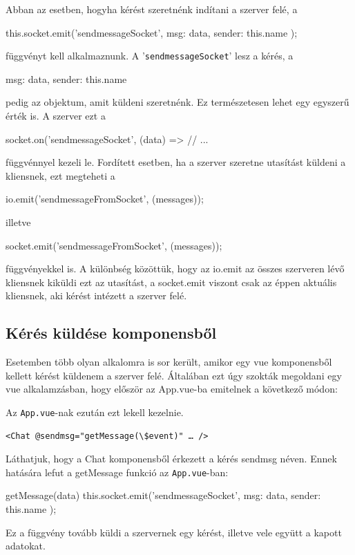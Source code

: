 
Abban az esetben, hogyha kérést szeretnénk indítani a szerver felé, a
\begin{javascript}
this.socket.emit('sendmessageSocket', {
	msg: data, sender: this.name
});
\end{javascript}
függvényt kell alkalmaznunk. A '\texttt{sendmessageSocket}' lesz a kérés, a 
\begin{javascript}
{msg: data, sender: this.name}
\end{javascript}
pedig az objektum, amit küldeni szeretnénk. Ez természetesen lehet egy egyszerű érték is. A szerver ezt a
\begin{javascript}
socket.on('sendmessageSocket', (data) => {
  // ...
}
\end{javascript}

függvénnyel kezeli le. Fordített esetben, ha a szerver szeretne utasítást küldeni a kliensnek, ezt megteheti a
\begin{javascript}
io.emit('sendmessageFromSocket', (messages));
\end{javascript}
illetve
\begin{javascript}
socket.emit('sendmessageFromSocket', (messages));
\end{javascript}
függvényekkel is. A különbség közöttük, hogy az io.emit az összes szerveren lévő kliensnek kiküldi ezt az utasítást, a socket.emit viszont csak az éppen aktuális kliensnek, aki kérést intézett a szerver felé.

\subsection{Kérés küldése komponensből}

Esetemben több olyan alkalomra is sor került, amikor egy vue komponensből kellett kérést küldenem a szerver felé. Általában ezt úgy szokták megoldani egy vue alkalamzásban, hogy először az App.vue-ba emitelnek a következő módon:
Az \texttt{App.vue}-nak ezután ezt lekell kezelnie.
\begin{verbatim}
<Chat @sendmsg="getMessage(\$event)" … />
\end{verbatim}%
Láthatjuk, hogy a Chat komponensből érkezett a kérés sendmsg néven. Ennek hatására lefut a getMessage funkció az \texttt{App.vue}-ban:
\begin{javascript}
getMessage(data){
  this.socket.emit('sendmessageSocket', {
    msg: data, sender: this.name
  });
}
\end{javascript}
Ez a függvény tovább küldi a szervernek egy kérést, illetve vele együtt a kapott adatokat.

